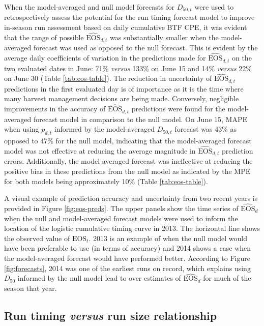 \documentclass[12pt,]{book}
\theoremstyle{definition}
\theoremstyle{definition}
\theoremstyle{definition}
\theoremstyle{remark}
\begin{document}
\noindent
When the model-averaged and null model forecasts for \(D_{50,t}\) were
used to retrospectively assess the potential for the run timing forecast
model to improve in-season run assessment based on daily cumulative BTF
CPE, it was evident that the range of possible
\(\widehat{\text{EOS}}_{d,t}\) was substantially smaller when the
model-averaged forecast was used as opposed to the null forecast. This
is evident by the average daily coefficients of variation in the
predictions made for \(\widehat{\text{EOS}}_{d,t}\) on the two evaluated
dates in June: 71\% \emph{versus} 133\% on June 15 and 14\%
\emph{versus} 22\% on June 30 (Table \ref{tab:eos-table}). The reduction
in uncertainty of \(\widehat{\text{EOS}}_{d,t}\) predictions in the
first evaluated day is of importance as it is the time where many
harvest management decisions are being made. Conversely, negligible
improvements in the accuracy of \(\widehat{\text{EOS}}_{d,t}\)
predictions were found for the model-averaged forecast model in
comparison to the null model. On June 15, MAPE when using \(p_{d,t}\)
informed by the model-averaged \(D_{50,t}\) forecast was 43\% as opposed
to 47\% for the null model, indicating that the model-averaged forecast
model was not effective at reducing the average magnitude in
\(\widehat{\text{EOS}}_{d,t}\) prediction errors. Additionally, the
model-averaged forecast was ineffective at reducing the positive bias in
these predictions from the null model as indicated by the MPE for both
models being approximately 10\% (Table \ref{tab:eos-table}).

A visual example of prediction accuracy and uncertainty from two recent
years is provided in Figure \ref{fig:eos-preds}. The upper panels show
the time series of \(\widehat{\text{EOS}}_{d}\) when the null and
model-averaged forecast models were used to inform the location of the
logistic cumulative timing curve in 2013. The horizontal line shows the
observed value of \(\text{EOS}_t\). 2013 is an example of when the null
model would have been preferable to use (in terms of accuracy) and 2014
shows a case when the model-averaged forecast would have performed
better. According to Figure \ref{fig:forecasts}, 2014 was one of the
earliest runs on record, which explains using \(D_{50}\) informed by the
null model lead to over estimates of \(\widehat{\text{EOS}}_{d}\) for
much of the season that year.

\subsection{\texorpdfstring{Run timing \emph{versus} run size
relationship}{Run timing versus run size relationship}}\label{rt-n-results}
\end{document}
